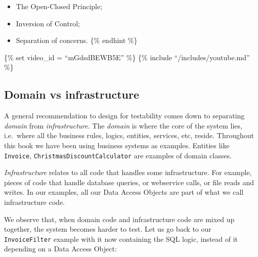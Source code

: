 \begin{itemize}
\tightlist
\item
  The Open-Closed Principle;
\item
  Inversion of Control;
\item
  Separation of concerns. \{\% endhint \%\}
\end{itemize}

\{\% set video\_id = ``mGdsdBEWB5E'' \%\} \{\% include
``/includes/youtube.md'' \%\}

\hypertarget{domain-vs-infrastructure}{%
\subsection{Domain vs infrastructure}\label{domain-vs-infrastructure}}

A general recommendation to design for testability comes down to
separating \emph{domain} from \emph{infrastructure}. The \emph{domain}
is where the core of the system lies, i.e.~where all the business rules,
logics, entities, services, etc, reside. Throughout this book we have
been using business systems as examples. Entities like \texttt{Invoice},
\texttt{ChristmasDiscountCalculator} are examples of domain classes.

\emph{Infrastructure} relates to all code that handles some
infrastructure. For example, pieces of code that handle database
queries, or webservice calls, or file reads and writes. In our examples,
all our Data Access Objects are part of what we call infrastructure
code.

We observe that, when domain code and infrastructure code are mixed up
together, the system becomes harder to test. Let us go back to our
\texttt{InvoiceFilter} example with it now containing the SQL logic,
instead of it depending on a Data Access Object:

